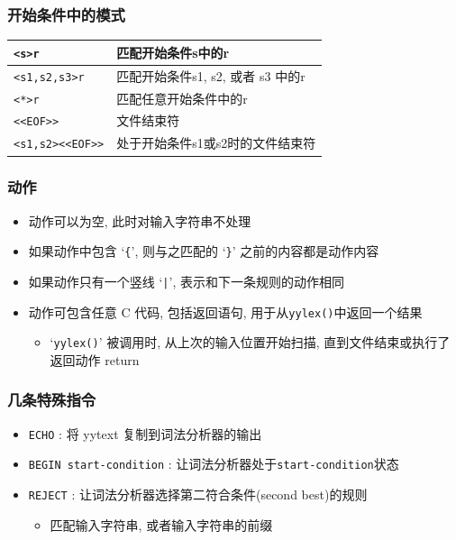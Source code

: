 \documentclass[compress]{beamer}
\begin{document}
\begin{frame}[containsverbatim]
\frametitle{开始条件中的模式}

{\footnotesize
\begin{tabular}{|l|l|}\hline
\verb~<s>r~ & 匹配开始条件s中的r \\ \hline
\verb~<s1,s2,s3>r~ & 匹配开始条件s1, s2, 或者 s3 中的r \\ \hline
\verb~<*>r~ & 匹配任意开始条件中的r \\ \hline
\verb~<<EOF>>~ & 文件结束符 \\ \hline
\verb~<s1,s2><<EOF>>~ & 处于开始条件s1或s2时的文件结束符 \\ \hline
\end{tabular}
}

\end{frame}

\begin{frame}[containsverbatim]
\frametitle{动作}

\begin{itemize}
\item 动作可以为空, 此时对输入字符串不处理

\item 如果动作中包含 `\verb~{~', 则与之匹配的 `\verb~}~' 之前的内容都是动作内容

\item 如果动作只有一个竖线 `\verb~|~', 表示和下一条规则的动作相同

\item 动作可包含任意 C 代码, 包括返回语句, 用于从\verb~yylex()~中返回一个结果
    \begin{itemize}
    \item `\verb~yylex()~' 被调用时, 从上次的输入位置开始扫描, 直到文件结束或执行了返回动作 return
    \end{itemize}

\end{itemize}

\end{frame}

\begin{frame}[containsverbatim]
\frametitle{几条特殊指令}
\begin{itemize}
\item \verb~ECHO~ : 将 yytext 复制到词法分析器的输出
\item \verb~BEGIN start-condition~ : 让词法分析器处于\verb~start-condition~状态
\item \verb~REJECT~ : 让词法分析器选择第二符合条件(second best)的规则
    \begin{itemize}
    \item 匹配输入字符串, 或者输入字符串的前缀
    \end{itemize}
\end{itemize}
\end{frame}
\end{document}
